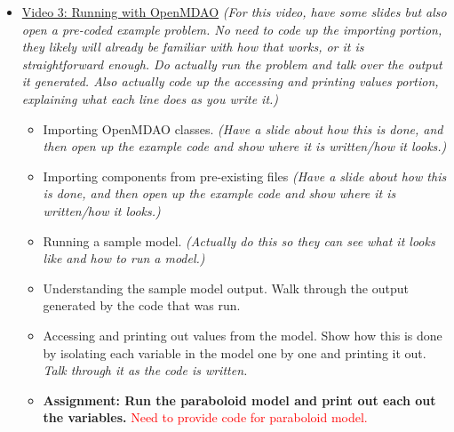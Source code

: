 \documentclass[12pt, letterpaper]{article}
\begin{document}
\begin{itemize}
	\item \underline{Video 3: Running with OpenMDAO} \textit{(For this video, have some slides but also open a pre-coded example problem. No need to code up the importing portion, they likely will already be familiar with how that works, or it is straightforward enough. Do actually run the problem and talk over the output it generated. Also actually code up the accessing and printing values portion, explaining what each line does as you write it.)}
		\begin{itemize}
			\item Importing OpenMDAO classes. \textit{(Have a slide about how this is done, and then open up the example code and show where it is written/how it looks.)}
			\item Importing components from pre-existing files \textit{(Have a slide about how this is done, and then open up the example code and show where it is written/how it looks.)}
			\item Running a sample model. \textit{(Actually do this so they can see what it looks like and how to run a model.)}
			\item Understanding the sample model output. Walk through the output generated by the code that was run.
			\item Accessing and printing out values from the model. Show how this is done by isolating each variable in the model one by one and printing it out. \textit{Talk through it as the code is written.}
			\item \textbf{Assignment: Run the paraboloid model and print out each out the variables.} \textcolor{red}{Need to provide code for paraboloid model.}
		\end{itemize}


\end{itemize}
\end{document}
